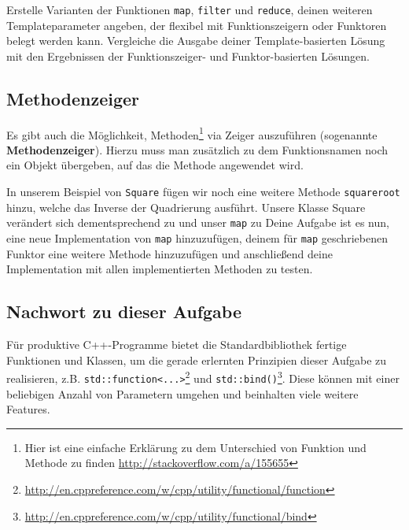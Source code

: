 Erstelle Varianten der Funktionen \lstinline{map}, \lstinline{filter} und \lstinline{reduce}, deinen weiteren Templateparameter angeben, der flexibel mit Funktionszeigern oder Funktoren belegt werden kann.
%
%
Vergleiche die Ausgabe deiner Template-basierten Lösung mit den Ergebnissen der Funktionszeiger- und Funktor-basierten Lösungen.

\subsection{Methodenzeiger}
\label{sec:functional_method}
Es gibt auch die Möglichkeit, Methoden\footnote{Hier ist eine einfache Erklärung zu dem Unterschied von Funktion und Methode zu finden \url{http://stackoverflow.com/a/155655}} via Zeiger auszuführen (sogenannte \textbf{Methodenzeiger}).
Hierzu muss man zusätzlich zu dem Funktionsnamen noch ein Objekt übergeben, auf das die Methode angewendet wird.

In unserem Beispiel von \lstinline{Square} fügen wir noch eine weitere Methode \lstinline{squareroot} hinzu, welche das Inverse der Quadrierung ausführt.
Unsere Klasse Square verändert sich dementsprechend zu
%
%
und unser \lstinline{map} zu 
%
%
Deine Aufgabe ist es nun, eine neue Implementation von \lstinline{map} hinzuzufügen, deinem für \lstinline{map} geschriebenen Funktor eine weitere Methode hinzuzufügen und anschließend deine Implementation mit allen implementierten Methoden zu testen.

\subsection*{Nachwort zu dieser Aufgabe}
Für produktive C++-Programme bietet die Standardbibliothek fertige Funktionen und Klassen, um die gerade erlernten Prinzipien dieser Aufgabe zu realisieren, z.B. \lstinline{std::function<...>}\footnote{\url{http://en.cppreference.com/w/cpp/utility/functional/function}} und \lstinline{std::bind()}\footnote{\url{http://en.cppreference.com/w/cpp/utility/functional/bind}}.
Diese können mit einer beliebigen Anzahl von Parametern umgehen und beinhalten viele weitere Features.
